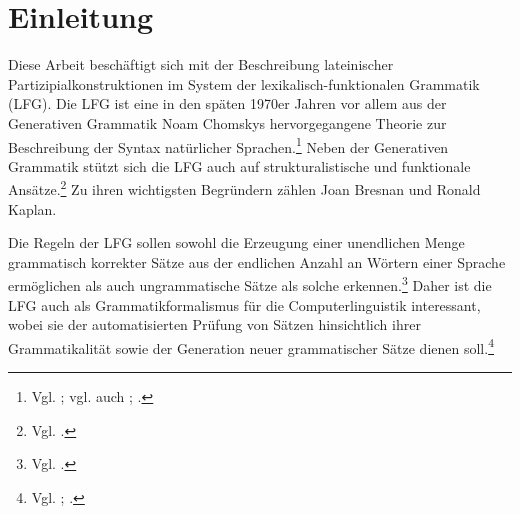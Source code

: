 \documentclass[12pt,a4paper]{article}
\begin{document}

\setcounter{page}{2}
\begingroup
\flushbottom
\begin{spacing}{1.25}
\tableofcontents
\end{spacing}
\thispagestyle{empty}
\pagebreak
\endgroup

\nocite{Menge}
\nocite{LHS}
\nocite{KSt}
\nocite{Rohrer}
\nocite{Skript}
\nocite{Dal}
\nocite{Falk}
\nocite{Bresnan}
\nocite{Snijders}
\nocite{DAZ}



\section{Einleitung}
Diese Arbeit beschäftigt sich mit der Beschreibung lateinischer Partizipialkonstruktionen im System der lexikalisch-funktionalen Grammatik (LFG). Die LFG ist eine in den späten 1970er Jahren vor allem aus der Generativen Grammatik Noam Chomskys hervorgegangene Theorie zur Beschreibung der Syntax natürlicher Sprachen.\footnote{Vgl. \cite[4]{Skript}; vgl. auch \cite[1]{Dal}; \cite[3]{Bresnan}.} Neben der Generativen Grammatik stützt sich die LFG auch auf strukturalistische und funktionale Ansätze.\footnote{Vgl. \cite[3]{Bresnan}.} Zu ihren wichtigsten Begründern zählen Joan Bresnan und Ronald Kaplan.

Die Regeln der LFG sollen sowohl die Erzeugung einer unendlichen Menge grammatisch korrekter Sätze aus der endlichen Anzahl an Wörtern einer Sprache ermöglichen als auch ungrammatische Sätze als solche erkennen.\footnote{Vgl. \cite[18]{Skript}.} Daher ist die LFG auch als Grammatikformalismus für die Computerlinguistik interessant, wobei sie der automatisierten Prüfung von Sätzen hinsichtlich ihrer Grammatikalität sowie der Generation neuer grammatischer Sätze dienen soll.\footnote{Vgl. \cite[18]{Skript}; \cite[vii]{Bresnan}.}
 
\end{document}
